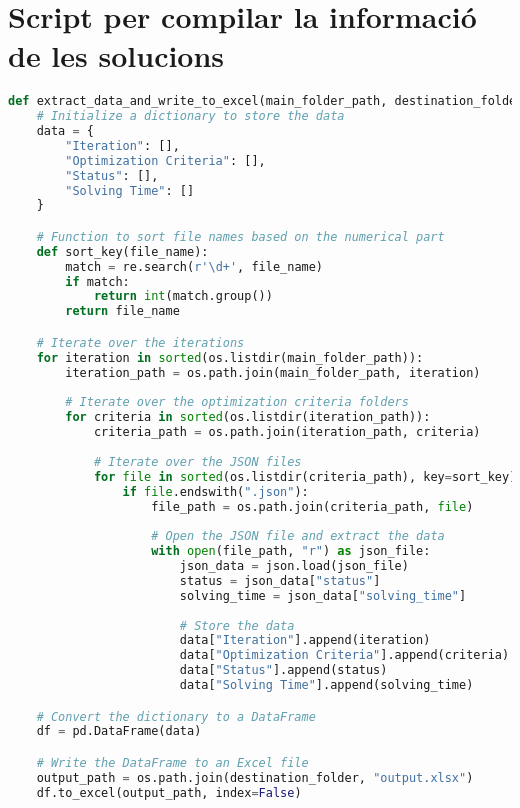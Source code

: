 
\chapter{Script per compilar la informació de les solucions} %
\label{AppendixC}
\begin{lstlisting}[language=Python]
    def extract_data_and_write_to_excel(main_folder_path, destination_folder):
    # Initialize a dictionary to store the data
    data = {
        "Iteration": [],
        "Optimization Criteria": [],
        "Status": [],
        "Solving Time": []
    }

    # Function to sort file names based on the numerical part
    def sort_key(file_name):
        match = re.search(r'\d+', file_name)
        if match:
            return int(match.group())
        return file_name

    # Iterate over the iterations
    for iteration in sorted(os.listdir(main_folder_path)):
        iteration_path = os.path.join(main_folder_path, iteration)
        
        # Iterate over the optimization criteria folders
        for criteria in sorted(os.listdir(iteration_path)):
            criteria_path = os.path.join(iteration_path, criteria)
            
            # Iterate over the JSON files
            for file in sorted(os.listdir(criteria_path), key=sort_key):
                if file.endswith(".json"):
                    file_path = os.path.join(criteria_path, file)
                    
                    # Open the JSON file and extract the data
                    with open(file_path, "r") as json_file:
                        json_data = json.load(json_file)
                        status = json_data["status"]
                        solving_time = json_data["solving_time"]
                        
                        # Store the data
                        data["Iteration"].append(iteration)
                        data["Optimization Criteria"].append(criteria)
                        data["Status"].append(status)
                        data["Solving Time"].append(solving_time)

    # Convert the dictionary to a DataFrame
    df = pd.DataFrame(data)

    # Write the DataFrame to an Excel file
    output_path = os.path.join(destination_folder, "output.xlsx")
    df.to_excel(output_path, index=False)
\end{lstlisting} 
